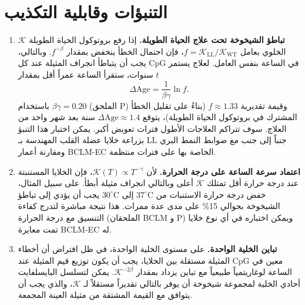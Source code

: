\documentclass[11pt,a4paper]{article}
\newcommand{\REL}{\mathcal{K}}          %
\begin{document}
	\section{التنبؤات وقابلية التكذيب}
	\label{sec:predictions}
	
	\begin{enumerate}
		\item \textbf{تباطؤ الشيخوخة تحت علاج الحياة الطويلة.}
		إذا رفع بروتوكول الحياة الطويلة \(\REL\) الخلوي بعامل \(f = \REL_{\mathrm{LL}}/\REL_{\mathrm{WT}}\)، فإن احتمال الخطأ ينخفض بمقدار \(f^{-\beta}\). وبالتالي، يجب أن يتباطأ انجراف المثيلة عند كل CpG في الساعة بنفس العامل. لعلاج يستمر \(t\) سنوات، ستقرأ الساعة عمراً أقل بمقدار
		\[
		\Delta\mathrm{Age} = \frac{1}{\beta\gamma} \ln f.
		\]
		باستخدام \(\beta\gamma = 0.20\) (الملحق P) وقيمة تقديرية \(f \approx 1.33\) (بناءً على تقليل الخطأ المشترك في بروتوكول الحياة الطويلة)، يتوقع \(\Delta\mathrm{Age} \approx 1.4\) سنة بعد شهر واحد من العلاج. سوف تتراكم العلاجات الأطول فترات تعويض أكبر. يمكن اختبار هذا التنبؤ بزراعة خلايا عضلة القلب المهندسة بـ LL جنباً إلى جنب مع ضوابط النمط البري ومقارنة أعمار BCLM-EC الخاصة بها على فترات منتظمة.
		
		\item \textbf{اعتماد سرعة الساعة على درجة الحرارة.}
		لأن \(\REL(T) \propto T^{-\gamma}\)، فإن الخلايا المستنبتة عند درجة حرارة أقل تمتلك \(\REL\) أعلى وبالتالي انجراف مثيلة أبطأ. على سبيل المثال، خفض درجة حرارة الاستنبات من \(37^\circ\text{C}\) إلى \(30^\circ\text{C}\) يجب أن يؤدي إلى تباطؤ الشيخوخة بحوالي 15\% على مدى عدة ممرات. هذا نتيجة مباشرة لتدرج كفاءة التنسيق مع درجة الحرارة (الملحقان BCLM و P) ويمكن اختباره في أي نوع خلايا تمت معايرة BCLM-EC له.
		
		\item \textbf{تباين الخلية الواحدة.}
		على مستوى الخلية الواحدة، في ظل افتراض أن أخطاء المثيلة مستقلة بين الخلايا، يجب أن يكون توزيع قيم المثيلة عند CpG معين في الساعة لوغاريتمياً طبيعياً مع تباين يزداد بمقدار \(\REL^{-2\beta}\). يمكن لتسلسل البايسلفايت أحادي الخلية لمجموعة شيخوخة أن يوفر بالتالي تقديراً مستقلاً لـ \(\REL\)، والذي يجب أن يتوافق مع القيمة المشتقة من مثيلة العينة المجمعة.
	\end{enumerate}
	
\end{document}
